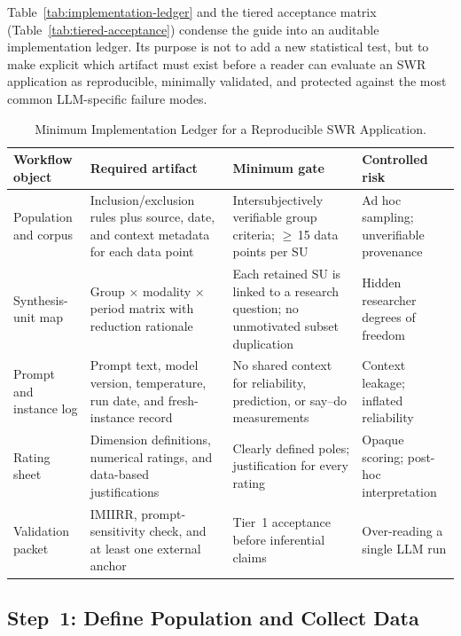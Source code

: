 \documentclass[11pt,a4paper]{article}
\begin{document}
Table~\ref{tab:implementation-ledger} and the tiered acceptance matrix (Table~\ref{tab:tiered-acceptance}) condense the guide into an auditable implementation ledger. Its purpose is not to add a new statistical test, but to make explicit which artifact must exist before a reader can evaluate an SWR application as reproducible, minimally validated, and protected against the most common LLM-specific failure modes.

\begin{table}[htbp]
  \centering
  \caption{Minimum Implementation Ledger for a Reproducible SWR Application.}
  \label{tab:implementation-ledger}\label{tab:implementierungsledger}
  \scriptsize
  \begin{tabularx}{\textwidth}{@{} L{2.6cm} Y Y Y @{}}
    \toprule
    \textbf{Workflow object} & \textbf{Required artifact} & \textbf{Minimum gate} & \textbf{Controlled risk} \\
    \midrule
    Population and corpus & Inclusion/exclusion rules plus source, date, and context metadata for each data point & Intersubjectively verifiable group criteria; $\geq$\,15 data points per SU & Ad hoc sampling; unverifiable provenance \\[3pt]
    Synthesis-unit map & Group $\times$ modality $\times$ period matrix with reduction rationale & Each retained SU is linked to a research question; no unmotivated subset duplication & Hidden researcher degrees of freedom \\[3pt]
    Prompt and instance log & Prompt text, model version, temperature, run date, and fresh-instance record & No shared context for reliability, prediction, or say--do measurements & Context leakage; inflated reliability \\[3pt]
    Rating sheet & Dimension definitions, numerical ratings, and data-based justifications & Clearly defined poles; justification for every rating & Opaque scoring; post-hoc interpretation \\[3pt]
    Validation packet & IMIIRR, prompt-sensitivity check, and at least one external anchor & Tier~1 acceptance before inferential claims & Over-reading a single LLM run \\
    \bottomrule
  \end{tabularx}
\end{table}

\subsection{Step~1: Define Population and Collect Data}
\label{sec:app:step1}
\end{document}
